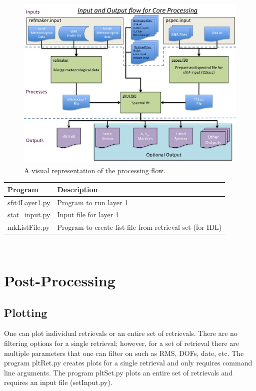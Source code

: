 \documentclass[12pt, letterpaper]{article}
\begin{document}
\begin{figure}[H]
\includegraphics[width=1.0\textwidth]{Slide05}
\caption{A visual representation of the processing flow. }
\label{figure:Layer1Flow}
\end{figure}


\begin{tabular}{ l l }
\textbf{Program} & \textbf{Description} \\
\hline
sfit4Layer1.py      & Program to run layer 1\\
stat\_input.py       & Input file for layer 1\\
mkListFile.py       & Program to create list file from retrieval set (for IDL)\\
\end{tabular} \\

\section{Post-Processing}
\subsection{Plotting}
One can plot individual retrievals or an entire set of retrievals. There are no filtering options for a single retrieval; however, for a set of retrieval there are multiple parameters that one can filter on such as RMS, DOFs, date, etc. The program pltRet.py creates plots for a single retrieval and only requires command line arguments. The program pltSet.py plots an entire set of retrievals and requires an input file (setInput.py).\\
\end{document}
